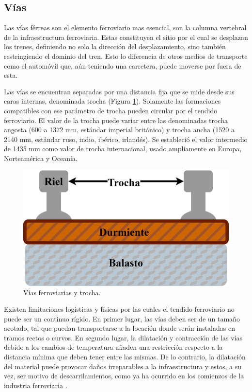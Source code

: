 \subsection{Vías}
	\label{sec:tracks}
	
    Las vías férreas son el elemento ferroviario mas esencial, son la columna vertebral de la infraestructura ferroviaria. Estas constituyen el sitio por el cual se desplazan los trenes, definiendo no solo la dirección del desplazamiento, sino también restringiendo el dominio del tren. Esto lo diferencia de otros medios de transporte como el automóvil que, aún teniendo una carretera, puede moverse por fuera de esta.

    Las vías se encuentran separadas por una distancia fija que se mide desde sus caras internas, denominada trocha (Figura \ref{fig:vias_1}). Solamente las formaciones compatibles con ese parámetro de trocha pueden circular por el tendido ferroviario. El valor de la trocha puede variar entre las denominadas trocha angosta (600 a 1372 mm, estándar imperial británico) y trocha ancha (1520 a 2140 mm, estándar ruso, indio, ibérico, irlandés). Se estableció el valor intermedio de 1435 mm como valor de trocha internacional, usado ampliamente en Europa, Norteamérica y Oceanía.

    \begin{figure}[H]
        \centering
        \includegraphics[width=1\textwidth]{Figuras/trocha.png}
        \centering\caption{Vías ferroviarias y trocha.}
        \label{fig:vias_1}
    \end{figure}
    
    Existen limitaciones logísticas y físicas por las cuales el tendido ferroviario no puede ser un continuo rígido. En primer lugar, las vías deben ser de un tamaño acotado, tal que puedan transportarse a la locación donde serán instaladas en tramos rectos o curvos. En segundo lugar, la dilatación y contracción de las vías debido a los cambios de temperatura añaden una restricción respecto a la distancia mínima que deben tener entre las mismas. De lo contrario, la dilatación del material puede provocar daños irreparables a la infraestructura y estos, a su vez, ser motivo de descarrilamientos, como ya ha ocurrido en los comienzos de la industria ferroviaria \cite{ACCIDENTE}. 
    
